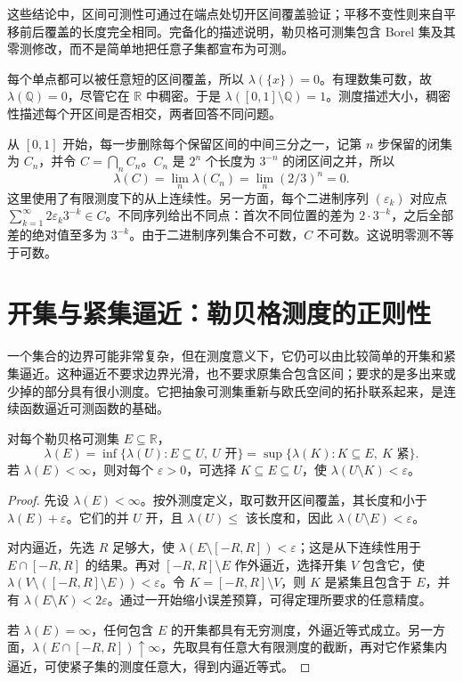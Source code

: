 \documentclass[UTF8,12pt,a4paper,fontset=fandol]{ctexbook}
\begin{document}
这些结论中，区间可测性可通过在端点处切开区间覆盖验证；平移不变性则来自平移前后覆盖的长度完全相同。完备化的描述说明，勒贝格可测集包含 Borel 集及其零测修改，而不是简单地把任意子集都宣布为可测。

\begin{example}[稠密性与测度大小无关]
每个单点都可以被任意短的区间覆盖，所以 $\lambda(\{x\})=0$。有理数集可数，故 $\lambda(\mathbb Q)=0$，尽管它在 $\mathbb R$ 中稠密。于是 $\lambda([0,1]\setminus\mathbb Q)=1$。测度描述大小，稠密性描述每个开区间是否相交，两者回答不同问题。
\end{example}

\begin{example}[不可数的零测集]
从 $[0,1]$ 开始，每一步删除每个保留区间的中间三分之一，记第 $n$ 步保留的闭集为 $C_n$，并令 $C=\bigcap_nC_n$。$C_n$ 是 $2^n$ 个长度为 $3^{-n}$ 的闭区间之并，所以
\[
 \lambda(C)=\lim_n\lambda(C_n)=\lim_n(2/3)^n=0.
\]
这里使用了有限测度下的从上连续性。另一方面，每个二进制序列 $(\varepsilon_k)$ 对应点 $\sum_{k=1}^{\infty}2\varepsilon_k3^{-k}\in C$。不同序列给出不同点：首次不同位置的差为 $2\cdot3^{-k}$，之后全部差的绝对值至多为 $3^{-k}$。由于二进制序列集合不可数，$C$ 不可数。这说明零测不等于可数。
\end{example}

\section{开集与紧集逼近：勒贝格测度的正则性}
\label{sec:mt-regularity}
一个集合的边界可能非常复杂，但在测度意义下，它仍可以由比较简单的开集和紧集逼近。这种逼近不要求边界光滑，也不要求原集合包含区间；要求的是多出来或少掉的部分具有很小测度。它把抽象可测集重新与欧氏空间的拓扑联系起来，是连续函数逼近可测函数的基础。

\begin{theorem}[实轴上勒贝格测度的正则性]
对每个勒贝格可测集 $E\subseteq\mathbb R$，
\[
 \lambda(E)=\inf\{\lambda(U):E\subseteq U,\ U\text{ 开}\}
 =\sup\{\lambda(K):K\subseteq E,\ K\text{ 紧}\}.
\]
若 $\lambda(E)<\infty$，则对每个 $\varepsilon>0$，可选择 $K\subseteq E\subseteq U$，使 $\lambda(U\setminus K)<\varepsilon$。
\label{thm:mt-regularity}
\end{theorem}
\begin{proof}
先设 $\lambda(E)<\infty$。按外测度定义，取可数开区间覆盖，其长度和小于 $\lambda(E)+\varepsilon$。它们的并 $U$ 开，且 $\lambda(U)\leq$ 该长度和，因此 $\lambda(U\setminus E)<\varepsilon$。

对内逼近，先选 $R$ 足够大，使 $\lambda(E\setminus[-R,R])<\varepsilon$；这是从下连续性用于 $E\cap[-R,R]$ 的结果。再对 $[-R,R]\setminus E$ 作外逼近，选择开集 $V$ 包含它，使 $\lambda(V\setminus([-R,R]\setminus E))<\varepsilon$。令 $K=[-R,R]\setminus V$，则 $K$ 是紧集且包含于 $E$，并有 $\lambda(E\setminus K)<2\varepsilon$。通过一开始缩小误差预算，可得定理所要求的任意精度。

若 $\lambda(E)=\infty$，任何包含 $E$ 的开集都具有无穷测度，外逼近等式成立。另一方面，$\lambda(E\cap[-R,R])\uparrow\infty$，先取具有任意大有限测度的截断，再对它作紧集内逼近，可使紧子集的测度任意大，得到内逼近等式。
\end{proof}
\end{document}
